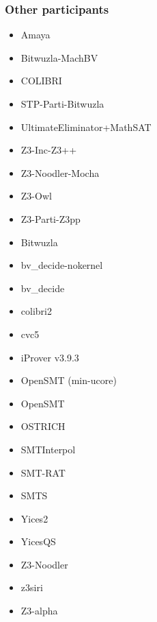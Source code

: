 \documentclass[table]{beamer}
\begin{document}
\begin{frame}
  \frametitle{Other participants}

  \begin{center}
  \begin{minipage}{0.49\textwidth}  %
    \begin{itemize}
      \item Amaya
      \item Bitwuzla-MachBV
      \item COLIBRI
      \item STP-Parti-Bitwuzla
      \item UltimateEliminator+MathSAT
      \item Z3-Inc-Z3++
      \item Z3-Noodler-Mocha
      \item Z3-Owl
      \item Z3-Parti-Z3pp
      \item Bitwuzla
      \item bv\_decide-nokernel
      \item bv\_decide
      \item colibri2
    \end{itemize}
  \end{minipage}
  \begin{minipage}{0.49\textwidth}  %
    \begin{itemize}
      \item cvc5
      \item iProver v3.9.3
      \item OpenSMT (min-ucore)
      \item OpenSMT
      \item OSTRICH
      \item SMTInterpol
      \item SMT-RAT
      \item SMTS
      \item Yices2
      \item YicesQS
      \item Z3-Noodler
      \item z3siri
      \item Z3-alpha
     \end{itemize}
  \end{minipage}
  \end{center}

\end{frame}
\end{document}
